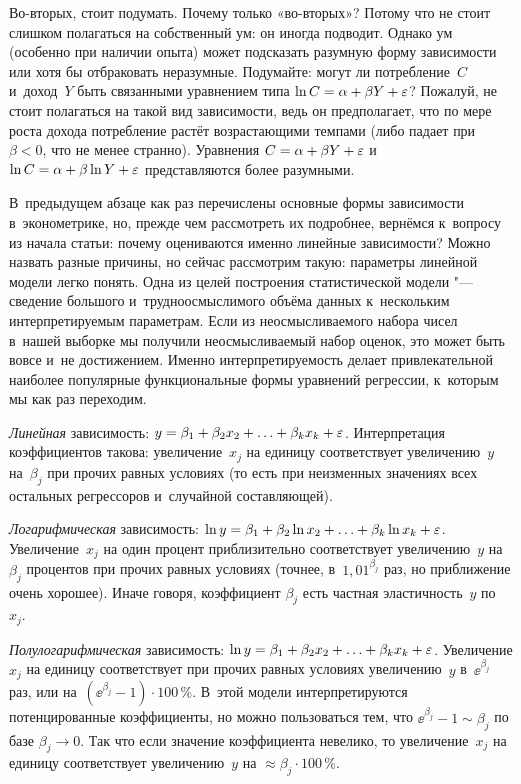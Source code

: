 \documentclass[final,pdftex]{../../template/epsilonj}
\begin{document}
Во-вторых, стоит подумать. Почему только «во-вторых»? Потому что не стоит слишком полагаться на собственный ум: он иногда подводит. Однако ум (особенно при наличии опыта) может подсказать разумную форму зависимости или хотя бы отбраковать неразумные. Подумайте: могут ли потребление~$C$ и~доход~$Y$ быть связанными уравнением типа $\ln C = \alpha + \beta Y + \varepsilon$? Пожалуй, не стоит полагаться на такой вид зависимости, ведь он предполагает, что по мере роста дохода потребление растёт возрастающими темпами (либо падает при $\beta<0$, что не менее странно). Уравнения $C = \alpha + \beta Y + \varepsilon$ и~$\ln C = \alpha + \beta \ln Y + \varepsilon$ представляются более разумными.

В~предыдущем абзаце как раз перечислены основные формы зависимости в~эконометрике, но, прежде чем рассмотреть их подробнее, вернёмся к~вопросу из начала статьи: почему оцениваются именно линейные зависимости? Можно назвать разные причины, но сейчас рассмотрим такую: параметры линейной модели легко понять. Одна из целей построения статистической модели "--- сведение большого и~трудноосмыслимого объёма данных к~нескольким интерпретируемым параметрам. Если из неосмысливаемого набора чисел в~нашей выборке мы получили неосмысливаемый набор оценок, это может быть вовсе и~не достижением. Именно интерпретируемость делает привлекательной наиболее популярные функциональные формы уравнений регрессии, к~которым мы как раз переходим.

\textit{Линейная} зависимость: $y = \beta_1 + \beta_2 x_2 + \ldots + \beta_k x_k + \varepsilon$. Интерпретация коэффициентов такова: увеличение~$x_j$ на единицу соответствует увеличению~$y$ на~$\beta_j$ при прочих равных условиях (то есть при неизменных значениях всех остальных регрессоров и~случайной составляющей). 

\textit{Логарифмическая} зависимость: $\ln y = \beta_1 + \beta_2 \ln x_2 + \ldots + \beta_k \ln x_k + \varepsilon$. Увеличение~$x_j$ на один процент приблизительно соответствует увеличению~$y$ на~$\beta_j$ процентов при прочих равных условиях (точнее, в~$1{,}01^{\beta_j}$ раз, но приближение очень хорошее). Иначе говоря, коэффициент $\beta_j$ есть частная эластичность~$y$ по~$x_j$.

\textit{Полулогарифмическая }зависимость: $\ln y = \beta_1 + \beta_2 x_2 + \ldots + \beta_k x_k + \varepsilon$. Увеличение $x_j$ на единицу соответствует при прочих равных условиях увеличению~$y$ в~$\ee^{\beta_j}$ раз, или на~$(\ee^{\beta_j}-1)\cdot 100\,\%$. В~этой модели интерпретируются потенцированные коэффициенты, но можно пользоваться тем, что $\ee^{\beta_j} - 1 \sim \beta_j$ по базе $\beta_j \to 0$. Так что если значение коэффициента невелико, то увеличение~$x_j$ на единицу соответствует увеличению~$y$ на $\approx \beta_j \cdot 100\,\%$.
\end{document}
